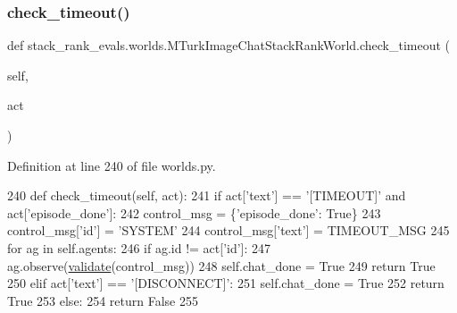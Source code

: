 \subsubsection{\texorpdfstring{check\+\_\+timeout()}{check\_timeout()}}
{\footnotesize\ttfamily def stack\+\_\+rank\+\_\+evals.\+worlds.\+M\+Turk\+Image\+Chat\+Stack\+Rank\+World.\+check\+\_\+timeout (\begin{DoxyParamCaption}\item[{}]{self,  }\item[{}]{act }\end{DoxyParamCaption})}



Definition at line 240 of file worlds.\+py.


\begin{DoxyCode}
240     \textcolor{keyword}{def }check\_timeout(self, act):
241         \textcolor{keywordflow}{if} act[\textcolor{stringliteral}{'text'}] == \textcolor{stringliteral}{'[TIMEOUT]'} \textcolor{keywordflow}{and} act[\textcolor{stringliteral}{'episode\_done'}]:
242             control\_msg = \{\textcolor{stringliteral}{'episode\_done'}: \textcolor{keyword}{True}\}
243             control\_msg[\textcolor{stringliteral}{'id'}] = \textcolor{stringliteral}{'SYSTEM'}
244             control\_msg[\textcolor{stringliteral}{'text'}] = TIMEOUT\_MSG
245             \textcolor{keywordflow}{for} ag \textcolor{keywordflow}{in} self.agents:
246                 \textcolor{keywordflow}{if} ag.id != act[\textcolor{stringliteral}{'id'}]:
247                     ag.observe(\hyperlink{namespaceparlai_1_1core_1_1worlds_afc3fad603b7bce41dbdc9cdc04a9c794}{validate}(control\_msg))
248             self.chat\_done = \textcolor{keyword}{True}
249             \textcolor{keywordflow}{return} \textcolor{keyword}{True}
250         \textcolor{keywordflow}{elif} act[\textcolor{stringliteral}{'text'}] == \textcolor{stringliteral}{'[DISCONNECT]'}:
251             self.chat\_done = \textcolor{keyword}{True}
252             \textcolor{keywordflow}{return} \textcolor{keyword}{True}
253         \textcolor{keywordflow}{else}:
254             \textcolor{keywordflow}{return} \textcolor{keyword}{False}
255 
\end{DoxyCode}
\mbox{\label{classstack__rank__evals_1_1worlds_1_1MTurkImageChatStackRankWorld_a518e69078a38528380731c4f1aa32149}} 
